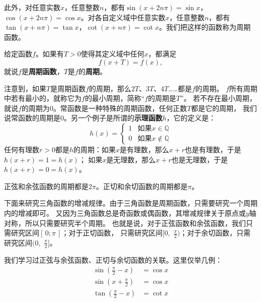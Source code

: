 \documentclass[12pt,UTF8,fontset=none]{ctexbook}
\begin{document}
此外，对任意实数$x$，任意整数$n$，都有$\sin(x+2n\pi) = \sin{x}$，$\cos(x+2n\pi) = \cos{x}$。对各自定义域中任意实数$x$，任意整数$n$，都有$\tan(x+n\pi) = \tan{x}$，$\cot(x+n\pi) = \cot{x}$。我们把这样的函数称为周期函数。
\begin{df}
    给定函数$f$。如果有$T>0$使得其定义域中任何$x$，都满足
    $$ f(x + T) = f(x),$$
    就说$f$是\textbf{周期函数}，$T$是$f$的\textbf{周期}。
\end{df}
注意到，如果$T$是周期函数$f$的周期，那么$2T$、$3T$、$4T$……都是$f$的周期。
$f$所有周期中若有最小的，就称它为$f$的最小周期，简称“$f$的周期是$T$”。
若不存在最小周期，就说$f$的周期为$0$。常函数是一种特殊的周期函数，任何正数$T$都是它的周期，
我们说常函数的周期是$0$。另一个例子是所谓的\textbf{示理函数}$h$，它的定义是：
$$
h(x) = \left\{
        \begin{array}{cc}
        1 & \mbox{如果}x\in\mathbb{Q} \\
        0 & \mbox{如果}x\notin\mathbb{Q} 
        \end{array}
    \right.
$$
任何有理数$r>0$都是$h$的周期：如果$x$是有理数，那么$x+r$也是有理数，于是$h(x+r) = 1 = h(x)$；
如果$x$是无理数，那么$x+r$也是无理数，于是$h(x+r) = 0 = h(x)$。

正弦和余弦函数的周期都是$2\pi$。正切和余切函数的周期都是$\pi$。

下面来研究三角函数的增减规律。由于三角函数是周期函数，只需要研究一个周期内的增减即可。
又因为三角函数总是奇函数或偶函数，其增减规律关于原点或$y$轴对称，所以只需要研究半个周期。
也就是说，对于正弦函数和余弦函数，我们只需研究区间$[\,0;\pi\,]$；对于正切函数，
只需研究区间$[0, \,\,\frac{\pi}{2})$；对于余切函数，只需研究区间$(0, \,\,\frac{\pi}{2}]$。

我们学习过正弦与余弦函数、正切与余切函数的关联。这里仅举几例：
\begin{align*}
    \sin{\left(\frac{\pi}{2} - x\right)} &= \cos{x}  \\
    \sin{\left(x + \frac{\pi}{2}\right)} &= \cos{x}  \\
    \tan{\left(\frac{\pi}{2} - x\right)} &= \cot{x}      
\end{align*}
\end{document}
